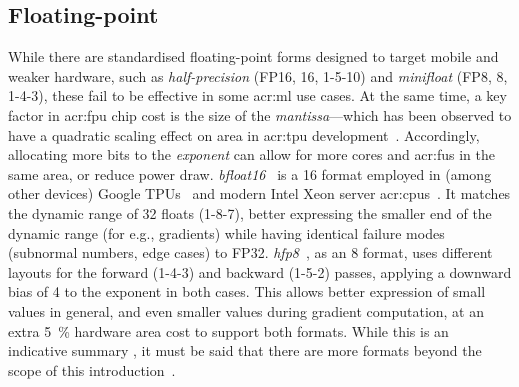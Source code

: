 \subsection{Floating-point}
While there are standardised floating-point forms designed to target mobile and weaker hardware, such as \emph{half-precision} (FP16, \qty{16}{\bit}, 1-5-10) and \emph{minifloat} (FP8, \qty{8}{\bit}, 1-4-3), these fail to be effective in some \gls{acr:ml} use cases.
At the same time, a key factor in \gls{acr:fpu} chip cost is the size of the \emph{mantissa}---which has been observed to have a quadratic scaling effect on area in \gls{acr:tpu} development~\parencite{bfloat16-blog}.
Accordingly, allocating more bits to the \emph{exponent} can allow for more cores and \glspl{acr:fu} in the same area, or reduce power draw.
\emph{bfloat16}~\parencite{bfloat16-blog} is a \qty{16}{\bit} format employed in (among other devices) Google TPUs~\parencite{DBLP:journals/sigops/XieDMKVZT18} and modern Intel Xeon server \glspl{acr:cpu}~\parencite{intel-bfloat}.
It matches the dynamic range of \qty{32}{\bit} floats (1-8-7), better expressing the smaller end of the dynamic range (for e.g., gradients) while having identical failure modes (subnormal numbers, edge cases) to FP32.
\emph{hfp8}~\parencite{DBLP:conf/nips/SunCCWVSCZG19}, as an \qty{8}{\bit} format, uses different layouts for the forward (1-4-3) and backward (1-5-2) passes, applying a downward bias of \num{4} to the exponent in both cases.
This allows better expression of small values in general, and even smaller values during gradient computation, at an extra \qty{5}{\percent} hardware area cost to support both formats.
While this is an indicative summary , it must be said that there are more formats beyond the scope of this introduction~\parencite{DBLP:journals/corr/abs-2007-01530}.

